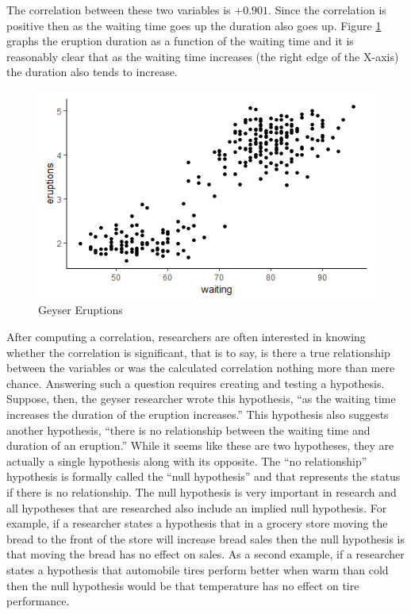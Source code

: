 The correlation between these two variables is $ +0.901 $. Since the correlation is positive then as the waiting time goes up the duration also goes up. Figure \ref{14:fig06} graphs the eruption duration as a function of the waiting time and it is reasonably clear that as the waiting time increases (the right edge of the X-axis) the duration also tends to increase.

\begin{figure}[H]
	\centering
	\includegraphics[width=\maxwidth{.95\linewidth}]{gfx/14_Faithful}
	\caption{Geyser Eruptions}
	\label{14:fig06}
\end{figure}

After computing a correlation, researchers are often interested in knowing whether the correlation is significant, that is to say, is there a true relationship between the variables or was the calculated correlation nothing more than mere chance. Answering such a question requires creating and testing a hypothesis. Suppose, then, the geyser researcher wrote this hypothesis, ``as the waiting time increases the duration of the eruption increases.'' This hypothesis also suggests another hypothesis, ``there is no relationship between the waiting time and duration of an eruption.'' While it seems like these are two hypotheses, they are actually a single hypothesis along with its opposite. The ``no relationship'' hypothesis is formally called the ``null hypothesis'' and that represents the status if there is no relationship. The null hypothesis is very important in research and all hypotheses that are researched also include an implied null hypothesis. For example, if a researcher states a hypothesis that in a grocery store moving the bread to the front of the store will increase bread sales then the null hypothesis is that moving the bread has no effect on sales. As a second example, if a researcher states a hypothesis that automobile tires perform better when warm than cold then the null hypothesis would be that temperature has no effect on tire performance.

